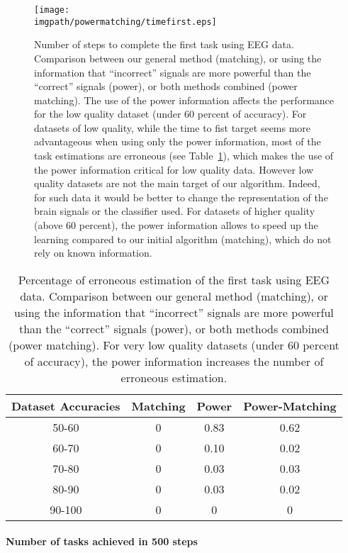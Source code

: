 \begin{figure}[!htbp]
\centering
\texttt{[image: \\imgpath/powermatching/timefirst.eps]}
\caption{Number of steps to complete the first task using EEG data. Comparison between our general method (matching), or using the information that ``incorrect'' signals are more powerful than the ``correct'' signals (power), or both methods combined (power matching). The use of the power information affects the performance for the low quality dataset (under 60 percent of accuracy). For datasets of low quality, while the time to fist target seems more advantageous when using only the power information, most of the task estimations are erroneous (see Table~\ref{tab:errorTaskRatio}), which makes the use of the power information critical for low quality data. However low quality datasets are not the main target of our algorithm. Indeed, for such data it would be better to change the representation of the brain signals or the classifier used. For datasets of higher quality (above 60 percent), the power information allows to speed up the learning compared to our initial algorithm (matching), which do not rely on known information.}
\label{fig:timefirst_powermatching}
\end{figure} 

\begin{table}
\centering
{}
\begin{tabular}{c c c c}
    Dataset Accuracies & Matching & Power & Power-Matching \\ \hline
    50-60 & 0 & 0.83 & 0.62 \\ 
    60-70 & 0 & 0.10 & 0.02 \\
    70-80 & 0 & 0.03 & 0.03 \\
    80-90 & 0 & 0.03 & 0.02 \\
    90-100 & 0 & 0 & 0 \\
\end{tabular}
\caption{Percentage of erroneous estimation of the first task using EEG data. Comparison between our general method (matching), or using the information that ``incorrect'' signals are more powerful than the ``correct'' signals (power), or both methods combined (power matching). For very low quality datasets (under 60 percent of accuracy), the power information increases the number of erroneous estimation.}
\label{tab:errorTaskRatio}
\end{table}


\paragraph{Number of tasks achieved in 500 steps}

